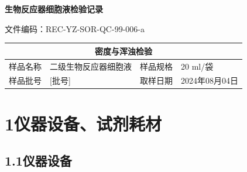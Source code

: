 \documentclass[UTF8,10pt,a4paper,fontset=fandol]{ctexart}
\newcommand{\fieldvalue}[1]{#1}
\newcommand{\handwritten}[1]{#1}
\begin{document}

\newpage

\begin{center}
\textbf{生物反应器细胞液检验记录}
\end{center}

\noindent
文件编码：REC-YZ-SOR-QC-99-006-a

\begin{center}
\begin{tabular}{|p{2.2cm}|p{5.2cm}|p{2.2cm}|p{4.0cm}|}
\hline
\multicolumn{4}{|c|}{密度与浑浊检验}\\
\hline
样品名称 &
\fieldvalue{二级生物反应器细胞液} &
样品规格 &
\fieldvalue{\handwritten{20 ml/袋}}\\
\hline
样品批号 &
\fieldvalue{\handwritten{[批号]}} &
取样日期 &
\fieldvalue{\handwritten{2024年08月04日}}\\
\hline
\end{tabular}
\end{center}

\section*{1\quad 仪器设备、试剂耗材}

\subsection*{1.1\quad 仪器设备}
\end{document}
